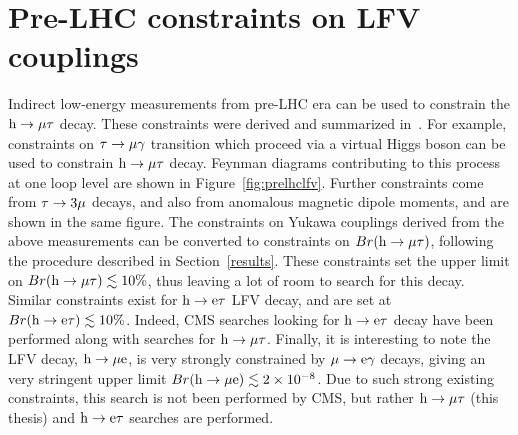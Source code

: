 \section{Pre-LHC constraints on LFV couplings}

Indirect low-energy measurements from pre-LHC era can be used to constrain the $\text{h} \to \mu \tau$ decay. These constraints were derived and summarized in~\cite{Harnik:2012pb}. For example, constraints on $\tau\rightarrow\mu\gamma$ transition which proceed via a virtual Higgs boson can be used to constrain $\text{h} \to \mu \tau$ decay. Feynman diagrams contributing to this process at one loop level are shown in Figure~\ref{fig:prelhclfv}. Further constraints come from $\tau\rightarrow 3\mu$ decays, and also from anomalous magnetic dipole moments, and are shown in the same figure. The constraints on Yukawa couplings derived from the above measurements can be converted to constraints on $Br(\text{h} \to \mu \tau)$, following the procedure described in Section~\ref{results}. These constraints set the upper limit on $Br(\text{h} \to \mu \tau)\lesssim 10\%$, thus leaving a lot of room to search for this decay. Similar constraints exist for $\text{h} \to \text{e} \tau$ LFV decay, and are set at $Br(\text{h} \to \text{e} \tau)\lesssim 10\%$. Indeed, CMS searches looking for $\text{h} \to \text{e} \tau$ decay have been performed along with searches for $\text{h} \to \mu \tau$. Finally, it is interesting to note the LFV decay, $\text{h} \to \mu \text{e}$, is very strongly constrained by $\mu\rightarrow\text{e}\gamma$ decays, giving an very stringent upper limit $Br(\text{h} \to \mu \text{e})\lesssim 2\times10^{-8}$. Due to such strong existing constraints, this search is not been performed by CMS, but rather $\text{h} \to \mu \tau$ (this thesis) and $\text{h} \to \text{e} \tau$ searches are performed.           

